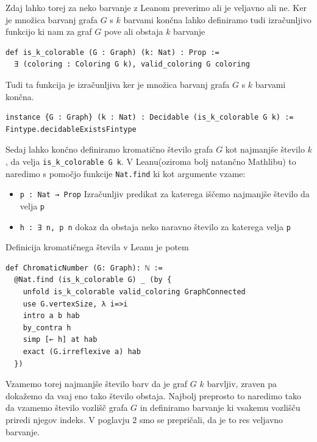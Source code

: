 \documentclass[mat1]{fmfdelo}
\begin{document}
Zdaj lahko torej za neko barvanje z Leanom preverimo ali je veljavno ali ne. 
Ker je množica barvanj grafa $G$ s $k$ barvami končna lahko definiramo tudi izračunljivo funkcijo ki nam 
za graf $G$ pove ali obstaja $k$ barvanje
\begin{lstlisting}
def is_k_colorable (G : Graph) (k: Nat) : Prop :=
  ∃ (coloring : Coloring G k), valid_coloring G coloring
\end{lstlisting}

Tudi ta funkcija je izračunljiva ker je množica barvanj grafa $G$ s $k$ barvami končna.
\begin{lstlisting}
instance {G : Graph} (k : Nat) : Decidable (is_k_colorable G k) := Fintype.decidableExistsFintype
\end{lstlisting}

Sedaj lahko končno definiramo kromatično število grafa $G$ kot najmanjše število $k$, da velja
\lstinline{is_k_colorable G k}. V Leanu(oziroma bolj natančno Mathlibu) to naredimo s pomočjo funkcije \lstinline{Nat.find}
ki kot argumente vzame:
\begin{itemize}
    \item \lstinline{p : Nat → Prop} Izračunljiv predikat za katerega iščemo najmanjše število da velja \lstinline{p}
    \item \lstinline{h : ∃ n, p n} dokaz da obstaja neko naravno število za katerega velja \lstinline{p}
\end{itemize}

Definicija kromatičnega števila v Leanu je potem
\begin{lstlisting}
def ChromaticNumber (G: Graph): ℕ :=
  @Nat.find (is_k_colorable G) _ (by {
    unfold is_k_colorable valid_coloring GraphConnected
    use G.vertexSize, λ i=>i
    intro a b hab
    by_contra h
    simp [← h] at hab
    exact (G.irreflexive a) hab
  })
\end{lstlisting}
Vzamemo torej najmanjše število barv da je graf $G$ $k$ barvljiv, zraven pa dokažemo da vsaj eno tako število obstaja.
Najbolj preprosto to naredimo tako da vzamemo število vozlišč grafa $G$ in definiramo barvanje ki vsakemu vozlišču priredi njegov indeks.
V poglavju 2 smo se prepričali, da je to res veljavno barvanje.
\end{document}
